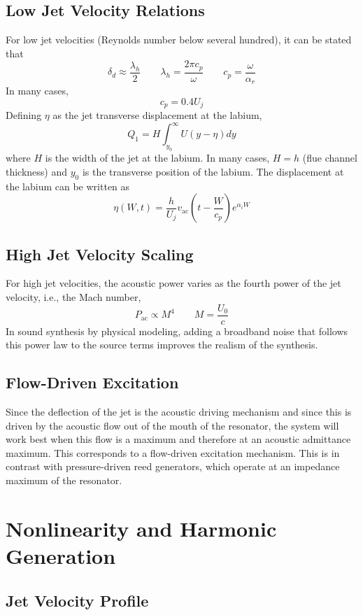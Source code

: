 \subsection{Low Jet Velocity Relations}

For low jet velocities (Reynolds number below several hundred), it can be stated that
\[
\delta_d \approx \frac{\lambda_h}{2}
\qquad
\lambda_h=\frac{2\pi c_p}{\omega}
\qquad
c_p=\frac{\omega}{\alpha_r}
\]
In many cases,
\[
c_p=0.4U_j
\]
Defining \( \eta \) as the jet transverse displacement at the labium,
\[
Q_1 = H\int_{y_0}^{\infty}U(y-\eta)dy
\]
where \(H\) is the width of the jet at the labium. In many cases, \(H=h\) (flue channel thickness) and \(y_0\) is the transverse position of the labium. The displacement at the labium can be written as
\[
\eta(W,t)=\frac{h}{U_j}v_{\mathrm{ac}}\left(t-\frac{W}{c_p}\right)e^{\alpha_i W}
\]

\subsection{High Jet Velocity Scaling}

For high jet velocities, the acoustic power varies as the fourth power of the jet velocity, i.e., the Mach number,
\[
P_{\mathrm{ac}}\propto M^{4}
\qquad
M=\frac{U_0}{c}
\]
In sound synthesis by physical modeling, adding a broadband noise that follows this power law to the source terms improves the realism of the synthesis.

\subsection{Flow-Driven Excitation}

Since the deflection of the jet is the acoustic driving mechanism and since this is driven by the acoustic flow out of the mouth of the resonator, the system will work best when this flow is a maximum and therefore at an acoustic admittance maximum. This corresponds to a flow-driven excitation mechanism. This is in contrast with pressure-driven reed generators, which operate at an impedance maximum of the resonator.

\section{Nonlinearity and Harmonic Generation}

\subsection{Jet Velocity Profile}

